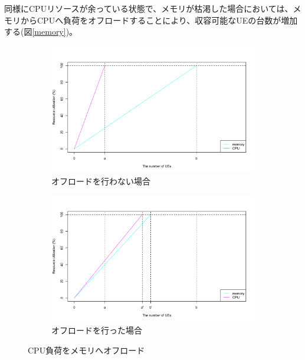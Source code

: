 \documentclass[a4j]{ujarticle}
\begin{document}
同様にCPUリソースが余っている状態で、メモリが枯渇した場合においては、メモリからCPUへ負荷をオフロードすることにより、収容可能なUEの台数が増加する(図\ref{memory})。





\begin{figure}[p]
	\centering
		\begin{subfigure}{1.0\textwidth}
			\includegraphics[width=1.0\hsize]{plot1.pdf}
			\caption{オフロードを行わない場合}
			\label{overcpu}
		\end{subfigure}
		\begin{subfigure}{1.0\textwidth}
			\includegraphics[width=1.0\hsize]{plot2.pdf}
		  \caption{オフロードを行った場合}
			\label{okcpu}
		\end{subfigure}
		\caption{CPU負荷をメモリへオフロード}
		\label{cpu}
\end{figure}
\end{document}
